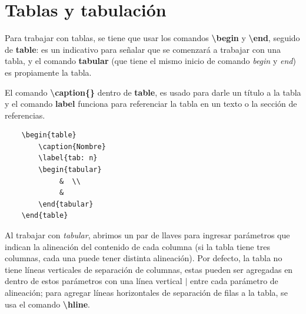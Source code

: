 \section{Tablas y tabulación}
\hspace{0.55cm}Para trabajar con tablas, se tiene que usar los comandos \textbf{\textbackslash{begin}} y \textbf{\textbackslash{end}}, seguido de \textbf{table}: es un indicativo para señalar que se comenzará a trabajar con una tabla, y el comando \textbf{tabular} (que tiene el mismo inicio de comando \textit{begin} y \textit{end}) es propiamente la tabla.

El comando \textbf{\textbackslash{caption\{\}}} dentro de \textbf{table}, es usado para darle un título a la tabla y el comando \textbf{label} funciona para referenciar la tabla en un texto o la sección de referencias.
\begin{lstlisting}
    \begin{table}
        \caption{Nombre}
        \label{tab: n}
        \begin{tabular}
             &  \\
             & 
        \end{tabular}
    \end{table}
\end{lstlisting}

Al trabajar con \textit{tabular}, abrimos un par de llaves para ingresar parámetros que indican la alineación del contenido de cada columna (si la tabla tiene tres columnas, cada una puede tener distinta alineación). Por defecto, la tabla no tiene líneas verticales de separación de columnas, estas pueden ser agregadas en dentro de estos parámetros con una línea vertical \textbf{\(|\)} entre cada parámetro de alineación; para agregar líneas horizontales de separación de filas a la tabla, se usa el comando \textbf{\textbackslash{hline}}.

